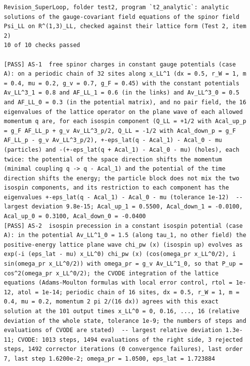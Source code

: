 \documentclass[
  10pt,
]{article}
\begin{document}
\begin{verbatim}
Revision_SuperLoop, folder test2, program `t2_analytic`: analytic solutions of the gauge-covariant field equations of the spinor field Psi_LL on R^(1,3)_LL, checked against their lattice form (Test 2, item 2)
10 of 10 checks passed

[PASS] AS-1  free spinor charges in constant gauge potentials (case A): on a periodic chain of 32 sites along x_LL^1 (dx = 0.5, r_W = 1, m = 0.4, mu = 0.2, g_v = 0.7, g_F = 0.45) with the constant potentials Av_LL^3_1 = 0.8 and AF_LL_1 = 0.6 (in the links) and Av_LL^3_0 = 0.5 and AF_LL_0 = 0.3 (in the potential matrix), and no pair field, the 16 eigenvalues of the lattice operator on the plane wave of each allowed momentum q are, for each isospin component (Q_LL = +1/2 with Acal_up_p = g_F AF_LL_p + g_v Av_LL^3_p/2, Q_LL = -1/2 with Acal_down_p = g_F AF_LL_p - g_v Av_LL^3_p/2), +-eps_lat(q - Acal_1) - Acal_0 - mu (particles) and -(+-eps_lat(q + Acal_1) - Acal_0 - mu) (holes), each twice: the potential of the space direction shifts the momentum (minimal coupling q -> q - Acal_1) and the potential of the time direction shifts the energy; the particle block does not mix the two isospin components, and its restriction to each component has the eigenvalues +-eps_lat(q - Acal_1) - Acal_0 - mu (tolerance 1e-12)  -- largest deviation 9.8e-15; Acal_up_1 = 0.5500, Acal_down_1 = -0.0100, Acal_up_0 = 0.3100, Acal_down_0 = -0.0400
[PASS] AS-2  isospin precession in a constant isospin potential (case A): in the potential Av_LL^1_0 = 1.5 (along tau_1, no other field) the positive-energy lattice plane wave chi_pw (x) (isospin up) evolves as exp(-i (eps_lat - mu) x_LL^0) chi_pw (x) (cos(omega_pr x_LL^0/2), i sin(omega_pr x_LL^0/2)) with omega_pr = g_v Av_LL^1_0, so that P_up = cos^2(omega_pr x_LL^0/2); the CVODE integration of the lattice equations (Adams-Moulton formulas with local error control, rtol = 1e-12, atol = 1e-14; periodic chain of 16 sites, dx = 0.5, r_W = 1, m = 0.4, mu = 0.2, momentum 2 pi 2/(16 dx)) agrees with this exact solution at the 101 output times x_LL^0 = 0, 0.16, ..., 16 (relative deviation of the whole state, tolerance 1e-9; the numbers of steps and evaluations of CVODE are stated)  -- largest relative deviation 1.3e-11; CVODE: 1013 steps, 1494 evaluations of the right side, 3 rejected steps, 1492 corrector iterations (0 convergence failures), last order 7, last step 1.6200e-2; omega_pr = 1.0500, eps_lat = 1.723884

\end{verbatim}
\end{document}
